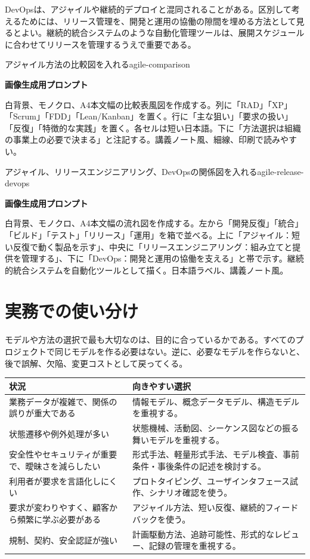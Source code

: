\documentclass[a4paper,11pt]{ltjsarticle}
\newcommand{\prompt}[1]{\par\noindent\textbf{画像生成用プロンプト}\par\small #1\normalsize}
\begin{document}
DevOpsは、アジャイルや継続的デプロイと混同されることがある。区別して考えるためには、リリース管理を、開発と運用の協働の隙間を埋める方法として見るとよい。継続的統合システムのような自動化管理ツールは、展開スケジュールに合わせてリリースを管理するうえで重要である。

\begin{todobox}{アジャイル方法の比較図を入れる}{agile-comparison}
\prompt{白背景、モノクロ、A4本文幅の比較表風図を作成する。列に「RAD」「XP」「Scrum」「FDD」「Lean/Kanban」を置く。行に「主な狙い」「要求の扱い」「反復」「特徴的な実践」を置く。各セルは短い日本語。下に「方法選択は組織の事業上の必要で決まる」と注記する。講義ノート風、細線、印刷で読みやすい。}
\end{todobox}

\begin{todobox}{アジャイル、リリースエンジニアリング、DevOpsの関係図を入れる}{agile-release-devops}
\prompt{白背景、モノクロ、A4本文幅の流れ図を作成する。左から「開発反復」「統合」「ビルド」「テスト」「リリース」「運用」を箱で並べる。上に「アジャイル：短い反復で動く製品を示す」、中央に「リリースエンジニアリング：組み立てと提供を管理する」、下に「DevOps：開発と運用の協働を支える」と帯で示す。継続的統合システムを自動化ツールとして描く。日本語ラベル、講義ノート風。}
\end{todobox}

\section{実務での使い分け}
モデルや方法の選択で最も大切なのは、目的に合っているかである。すべてのプロジェクトで同じモデルを作る必要はない。逆に、必要なモデルを作らないと、後で誤解、欠陥、変更コストとして戻ってくる。

\begin{longtable}{>{\raggedright\arraybackslash}p{}>{\raggedright\arraybackslash}p{}}
\toprule
\textbf{状況} & \textbf{向きやすい選択} \\
\midrule
業務データが複雑で、関係の誤りが重大である & 情報モデル、概念データモデル、構造モデルを重視する。\\
状態遷移や例外処理が多い & 状態機械、活動図、シーケンス図などの振る舞いモデルを重視する。\\
安全性やセキュリティが重要で、曖昧さを減らしたい & 形式手法、軽量形式手法、モデル検査、事前条件・事後条件の記述を検討する。\\
利用者が要求を言語化しにくい & プロトタイピング、ユーザインタフェース試作、シナリオ確認を使う。\\
要求が変わりやすく、顧客から頻繁に学ぶ必要がある & アジャイル方法、短い反復、継続的フィードバックを使う。\\
規制、契約、安全認証が強い & 計画駆動方法、追跡可能性、形式的なレビュー、記録の管理を重視する。\\
\bottomrule
\end{longtable}
\end{document}
